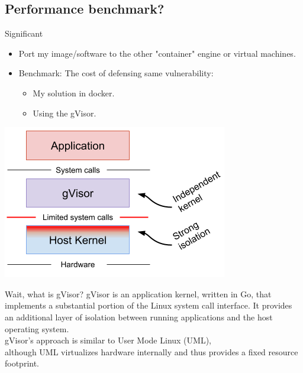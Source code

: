 \documentclass{beamer}
\begin{document}
\begin{CJK*}{UTF8}{bsmi}
  \section{Performance benchmark?}

  \begin{frame}{Significant}
    \begin{multicols*}{2}
      \begin{itemize}
        \item Port my image/software to the other "container" engine or virtual machines.
        \item Benchmark: The {\color{red} cost} of defensing same vulnerability:
              \begin{itemize}
                \item My solution in docker.
                \item Using the gVisor.
              \end{itemize}
      \end{itemize}
      \includegraphics[width=.45\textwidth]{gvisor.png}
    \end{multicols*}
  \end{frame}

  \begin{frame}{Wait, what is gVisor?}
    gVisor is an application kernel, written in Go, that implements a substantial portion of the Linux system call interface. It provides an additional layer of isolation between running applications and the host operating system.
    \\
    gVisor’s approach is similar to User Mode Linux (UML),\\
    although UML virtualizes hardware internally and thus provides a fixed resource footprint.
  \end{frame}


\end{CJK*}
\end{document}
